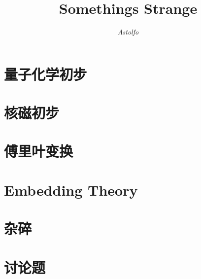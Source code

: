 \documentclass[lang=cn,10pt]{elegantbook}
\title{Somethings Strange}
\author{\textit{Astolfo}}
\begin{document}
\maketitle
\frontmatter


\mainmatter
\tableofcontents
\chapter{量子化学初步}

\chapter{核磁初步}

\chapter{傅里叶变换}

\chapter{Embedding Theory}

\chapter{杂碎}

\chapter{讨论题}

\end{document}
